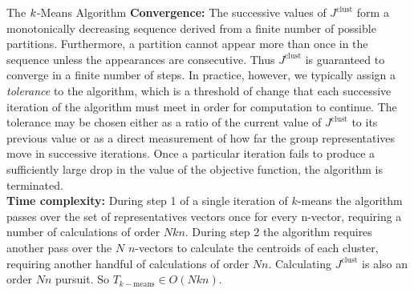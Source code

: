 \documentclass{article}
\begin{document}
\begin{section}{The $\boldmath{k}$-Means Algorithm}
\endadjustwidth
\textbf{Convergence:} The successive values of $J^{\text{clust}}$ form a monotonically decreasing sequence derived from a finite number of possible partitions. Furthermore, a partition cannot appear more than once in the sequence unless the appearances are consecutive. Thus $J^{\text{clust}}$ is guaranteed to converge in a finite number of steps. In practice, however, we typically assign a \textit{tolerance} to the algorithm, which is a threshold of change that each successive iteration of the algorithm must meet in order for computation to continue. The tolerance may be chosen either as a ratio of the current value of $J^{\text{clust}}$ to its previous value or as a direct measurement of how far the group representatives move in successive iterations. Once a particular iteration fails to produce a sufficiently large drop in the value of the objective function, the algorithm is terminated.\\

\textbf{Time complexity:} During step 1 of a single iteration of $k$-means the algorithm passes over the set of representatives vectors once for every n-vector, requiring a number of calculations of order $Nkn$.  During step 2 the algorithm requires another pass over the $N$ $n$-vectors to calculate the centroids of each cluster, requiring another handful of calculations of order $Nn$.  Calculating $J^{\text{clust}}$ is also an order $Nn$ pursuit. So $T_{k-\text{means}}\in O(Nkn)$.
\end{section}
\end{document}
